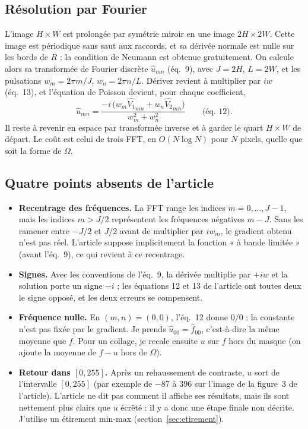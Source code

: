 \documentclass[11pt,a4paper]{article}
\newcommand{\ft}[1]{\widehat{#1}}
\begin{document}
\subsection{Résolution par Fourier}

L'image $H\times W$ est prolongée par symétrie miroir en une image $2H\times 2W$. Cette image est
périodique sans saut aux raccords, et sa dérivée normale est nulle sur les bords de $R$ : la condition
de Neumann est obtenue gratuitement. On calcule alors sa transformée de Fourier discrète
$\ft u_{mn}$ (éq.~9), avec $J=2H$, $L=2W$, et les pulsations $w_m = 2\pi m/J$, $w_n = 2\pi n/L$.
Dériver revient à multiplier par $i w$ (éq.~13), et l'équation de Poisson devient, pour chaque
coefficient,
\[
  \ft u_{mn} = \frac{-i\,\big(w_m \ft{V_1}_{mn} + w_n \ft{V_2}_{mn}\big)}{w_m^2 + w_n^2}
  \qquad\text{(éq.~12)}.
\]
Il reste à revenir en espace par transformée inverse et à garder le quart $H\times W$ de départ.
Le coût est celui de trois FFT, en $O(N\log N)$ pour $N$ pixels, quelle que soit la forme de $\Omega$.

\subsection{Quatre points absents de l'article}

\begin{itemize}
  \item \textbf{Recentrage des fréquences.} La FFT range les indices $m = 0,\dots,J-1$, mais les indices
  $m > J/2$ représentent les fréquences négatives $m-J$. Sans les ramener entre $-J/2$ et $J/2$ avant
  de multiplier par $i w_m$, le gradient obtenu n'est pas réel. L'article suppose implicitement la
  fonction « à bande limitée » (avant l'éq.~9), ce qui revient à ce recentrage.
  \item \textbf{Signes.} Avec les conventions de l'éq.~9, la dérivée multiplie par $+i w$ et la solution
  porte un signe $-i$ ; les équations 12 et 13 de l'article ont toutes deux le signe opposé, et les deux
  erreurs se compensent.
  \item \textbf{Fréquence nulle.} En $(m,n)=(0,0)$, l'éq.~12 donne $0/0$ : la constante n'est pas fixée
  par le gradient. Je prends $\ft u_{00} = \ft f_{00}$, c'est-à-dire la même moyenne que $f$. Pour un
  collage, je recale ensuite $u$ sur $f$ hors du masque (on ajoute la moyenne de $f-u$ hors de $\Omega$).
  \item \textbf{Retour dans $[0,255]$.} Après un rehaussement de contraste, $u$ sort de l'intervalle
  $[0,255]$ (par exemple de $-87$ à $396$ sur l'image de la figure~3 de l'article). L'article ne dit pas
  comment il affiche ses résultats, mais ils sont nettement plus clairs que $u$ écrêté : il y a donc une
  étape finale non décrite. J'utilise un étirement min-max (section~\ref{sec:etirement}).
\end{itemize}
\end{document}
